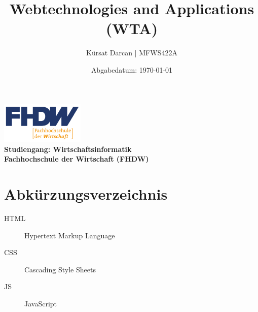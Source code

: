 \documentclass[a4paper,12pt]{article}
\title{\textbf{Webtechnologies and Applications (WTA)}}
\author{Kürsat Darcan | MFWS422A}
\date{Abgabedatum: \today}
\begin{document}
\maketitle
\thispagestyle{empty}
\vspace{2cm}
\begin{center}
    \includegraphics[width=0.3\textwidth]{FHDW_Logo_RGB-01.svg.png} %
    \\
    \vspace{1cm}
    \textbf{Studiengang: Wirtschaftsinformatik}\\
    \textbf{Fachhochschule der Wirtschaft (FHDW)}
\end{center}
\newpage

\renewcommand{\thepage}{\roman{page}} %
\tableofcontents
\newpage

\listoffigures
{}
\newpage

\listoftables
{}
\newpage

\section*{Abkürzungsverzeichnis}
\begin{description}
    \item[HTML] Hypertext Markup Language
    \item[CSS] Cascading Style Sheets
    \item[JS] JavaScript
\end{description}
\newpage

\renewcommand{\thepage}{\arabic{page}} %
\setcounter{page}{1}


\end{document}
